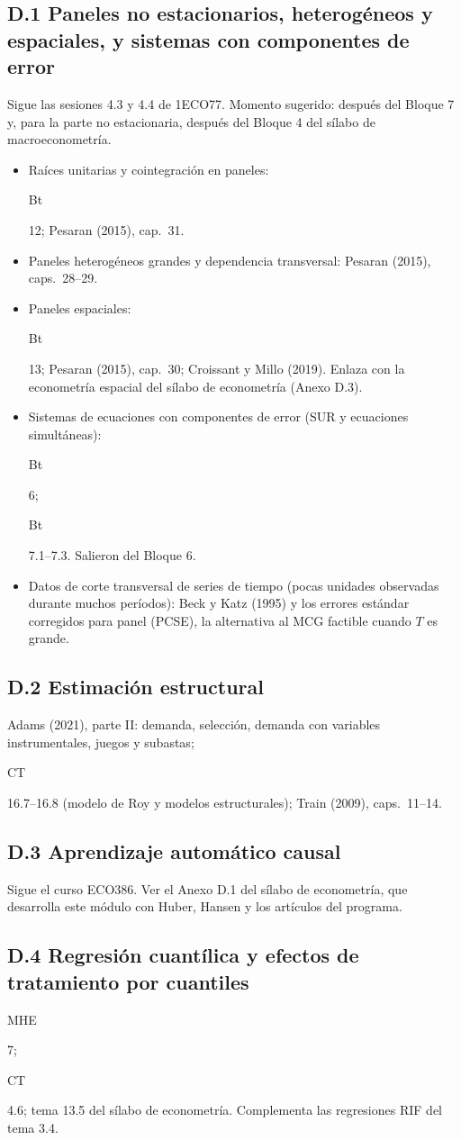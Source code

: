 \documentclass[11pt,a4paper]{article}
\newcommand{\etiqueta}[2]{%
  {\setlength{\fboxsep}{1.4pt}\colorbox{#1}{\sffamily\bfseries\color{white}\strut#2}}}
\newcommand{\CT}[1]{\etiqueta{colorCT}{CT}\nobreak\hspace{0.25em}\textcolor{colorCT}{#1}}
\newcommand{\MHE}[1]{\etiqueta{colorMHE}{MHE}\nobreak\hspace{0.25em}\textcolor{colorMHE}{#1}}
\newcommand{\BT}[1]{\etiqueta{colorBt}{Bt}\nobreak\hspace{0.25em}\textcolor{colorBt}{#1}}
\begin{document}
\subsection*{D.1 Paneles no estacionarios, heterogéneos y espaciales, y sistemas con componentes de error}
Sigue las sesiones 4.3 y 4.4 de 1ECO77. Momento sugerido: después del Bloque 7
y, para la parte no estacionaria, después del Bloque 4 del sílabo de
macroeconometría.
\begin{itemize}[leftmargin=1.4em,itemsep=1pt]
  \item Raíces unitarias y cointegración en paneles: \BT{12}; Pesaran (2015),
        cap.~31.
  \item Paneles heterogéneos grandes y dependencia transversal: Pesaran (2015),
        caps.~28--29.
  \item Paneles espaciales: \BT{13}; Pesaran (2015), cap.~30; Croissant y
        Millo (2019). Enlaza con la econometría espacial del sílabo de
        econometría (Anexo D.3).
  \item Sistemas de ecuaciones con componentes de error (SUR y ecuaciones
        simultáneas): \BT{6}; \BT{7.1--7.3}. Salieron del Bloque 6.
  \item Datos de corte transversal de series de tiempo (pocas unidades
        observadas durante muchos períodos): Beck y Katz (1995) y los errores
        estándar corregidos para panel (PCSE), la alternativa al MCG factible
        cuando $T$ es grande.
\end{itemize}

\subsection*{D.2 Estimación estructural}
Adams (2021), parte II: demanda, selección, demanda con variables
instrumentales, juegos y subastas; \CT{16.7--16.8} (modelo de Roy y modelos
estructurales); Train (2009), caps.~11--14.

\subsection*{D.3 Aprendizaje automático causal}
Sigue el curso ECO386. Ver el Anexo D.1 del sílabo de econometría, que
desarrolla este módulo con Huber, Hansen y los artículos del programa.

\subsection*{D.4 Regresión cuantílica y efectos de tratamiento por cuantiles}
\MHE{7}; \CT{4.6}; tema 13.5 del sílabo de econometría. Complementa las regresiones RIF del tema 3.4.
\end{document}
